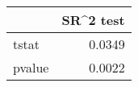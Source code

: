 \begin{tabular}{lr}
\toprule
{} &  SR\textasciicircum 2 test \\
\midrule
tstat  &     0.0349 \\
pvalue &     0.0022 \\
\bottomrule
\end{tabular}

